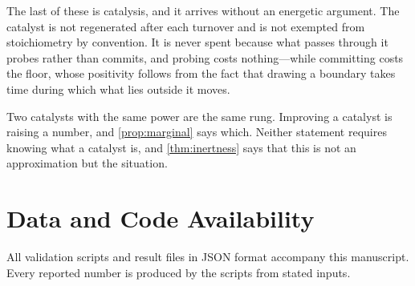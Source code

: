 \documentclass[11pt,twocolumn,a4paper]{article}
\theoremstyle{plain}
\theoremstyle{definition}
\theoremstyle{remark}
\begin{document}
The last of these is catalysis, and it arrives without an energetic argument.
The catalyst is not regenerated after each turnover and is not exempted from
stoichiometry by convention. It is never spent because what passes through it
probes rather than commits, and probing costs nothing---while committing costs
the floor, whose positivity follows from the fact that drawing a boundary takes
time during which what lies outside it moves.

Two catalysts with the same power are the same rung. Improving a catalyst is
raising a number, and \cref{prop:marginal} says which. Neither
statement requires knowing what a catalyst is, and \cref{thm:inertness} says
that this is not an approximation but the situation.

\section*{Data and Code Availability}
\label{sec:data-availability}

All validation scripts and result files in JSON format accompany this
manuscript. Every reported number is produced by the scripts from stated
inputs.



\end{document}
